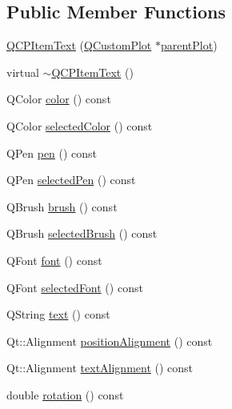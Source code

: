 \subsection*{Public Member Functions}
\begin{DoxyCompactItemize}
\item 
\mbox{\hyperlink{class_q_c_p_item_text_a77ff96a2972a00872ff8f8c67143abbe}{Q\+C\+P\+Item\+Text}} (\mbox{\hyperlink{class_q_custom_plot}{Q\+Custom\+Plot}} $\ast$\mbox{\hyperlink{class_q_c_p_layerable_a473edb813a4c1929d6b6a8fe3ff3faf7}{parent\+Plot}})
\item 
virtual \mbox{\hyperlink{class_q_c_p_item_text_a1efd41ca53d49042d4f4b63cf9615cb6}{$\sim$\+Q\+C\+P\+Item\+Text}} ()
\item 
Q\+Color \mbox{\hyperlink{class_q_c_p_item_text_a071ec7567ae4deae2262a5b861df7d54}{color}} () const
\item 
Q\+Color \mbox{\hyperlink{class_q_c_p_item_text_a6e13d5497ea634fe1ee9f4aac94f664c}{selected\+Color}} () const
\item 
Q\+Pen \mbox{\hyperlink{class_q_c_p_item_text_a7039d313069547682f28688448333979}{pen}} () const
\item 
Q\+Pen \mbox{\hyperlink{class_q_c_p_item_text_a852a79afa0e88e29e11474d323440126}{selected\+Pen}} () const
\item 
Q\+Brush \mbox{\hyperlink{class_q_c_p_item_text_a2600b9b419f17e2e2381f5ed8267da62}{brush}} () const
\item 
Q\+Brush \mbox{\hyperlink{class_q_c_p_item_text_a300770cc32acf3e92763651803482563}{selected\+Brush}} () const
\item 
Q\+Font \mbox{\hyperlink{class_q_c_p_item_text_a44a564431890ffdfe0f978f8732cfb81}{font}} () const
\item 
Q\+Font \mbox{\hyperlink{class_q_c_p_item_text_a74c947c6193e3b47884fac84fdb29922}{selected\+Font}} () const
\item 
Q\+String \mbox{\hyperlink{class_q_c_p_item_text_ad71c9e83ee3556d9d617eca854e8eb18}{text}} () const
\item 
Qt\+::\+Alignment \mbox{\hyperlink{class_q_c_p_item_text_a0d946dca3008d353afd04b4337739199}{position\+Alignment}} () const
\item 
Qt\+::\+Alignment \mbox{\hyperlink{class_q_c_p_item_text_a9af3198d46551e1cc7703f02c95ddfe5}{text\+Alignment}} () const
\item 
double \mbox{\hyperlink{class_q_c_p_item_text_a035962b4ed23ff0a89e6a8b46fa18bf1}{rotation}} () const
\item 

\end{DoxyCompactItemize}
